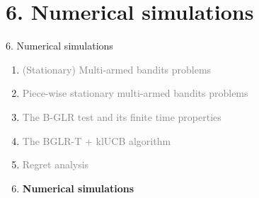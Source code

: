 \documentclass[11pt,english,ignorenonframetext,]{beamer}
\begin{document}
\section{\hfill{}6. Numerical simulations\hfill{}}

\begin{frame}{6. Numerical simulations}

  \begin{enumerate}
    \item
    \textcolor{gray}{
      (Stationary) Multi-armed bandits problems
    }
    \vspace*{15pt}

    \item
    \textcolor{gray}{
      Piece-wise stationary multi-armed bandits problems
    }
    \vspace*{15pt}

    \item
    \textcolor{gray}{
      The B-GLR test and its finite time properties
    }
    \vspace*{15pt}

    \item
    \textcolor{gray}{
      The BGLR-T + klUCB algorithm
    }
    \vspace*{15pt}

    \item
    \textcolor{gray}{
      Regret analysis
    }
    \vspace*{15pt}

    \item
    \alert{\textbf{%
      Numerical simulations
    }}
  \end{enumerate}

\end{frame}
\end{document}
